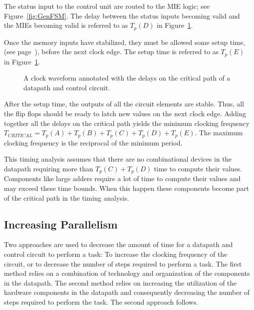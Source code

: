 The status input to the control unit are routed to the MIE logic;
see Figure~\ref{fig:GenFSM}.  The delay between the status inputs
becoming valid and the MIEs becoming valid is referred to as $T_p(D)$ 
in Figure~\ref{fig:DPTime}.

Once the memory inputs have stabilized, they must be allowed
some setup time, (see page~\pageref{page:setup}), before the next
clock edge.  The setup time is referred to as $T_p(E)$ in 
Figure~\ref{fig:DPTime}.

\begin{figure}[ht]
\caption{A clock waveform annotated with the delays on the
critical path of a datapath and control circuit.}
\label{fig:DPTime}
\end{figure}

After the setup time, the outputs of all the circuit elements 
are stable.  Thus, all the flip flops should be ready to latch new 
values on the next clock edge.  Adding together all the
delays on the critical path yields the minimum clocking frequency
$T_{CRITICAL}=T_p(A)+T_p(B)+T_p(C)+T_p(D)+T_p(E)$. The maximum
clocking frequency is the reciprocal of the minimum period.

This timing analysis assumes that there are no combinational devices in 
the datapath requiring more than $T_p(C)+T_p(D)$ time to compute their 
values.  Components like large adders require a lot of time to compute
their values and may exceed these time bounds.  When this happen these 
components become part of the critical path in the timing analysis.

\subsection{Increasing Parallelism}

Two approaches are used to decrease the amount of time for a 
datapath and control circuit to perform a task: To increase 
the clocking frequency of the circuit, or to decrease the number of
steps required to perform a task.  The first method relies on a
combination of technology and organization of the components in 
the datapath.  The second method relies on increasing the utilization 
of the hardware components in the datapath and consequently decreasing
the number of steps required to perform the task.  
The second approach follows.

